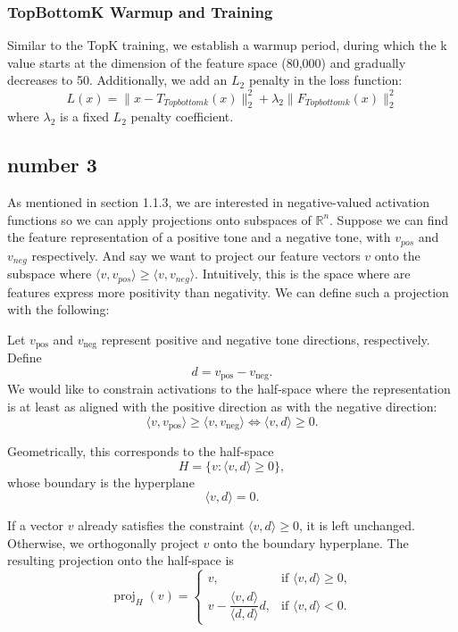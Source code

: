 \documentclass{article}
\begin{document}
\subsubsection{TopBottomK Warmup and Training}
    Similar to the TopK training, we establish a warmup period, during which the k value starts at the dimension of the feature space (80,000) and gradually decreases to 50. Additionally, we add an $L_2$ penalty in the loss function:
    $$
    L(x) = \|x - T_{Topbottomk}(x)\|_2^2 + \lambda_2 \|F_{Topbottomk}(x)\|_2^2
    $$
    where $\lambda_2$ is a fixed $L_2$ penalty coefficient.

\subsection{number 3}
As mentioned in section 1.1.3, we are interested in negative-valued activation functions so we can apply projections onto subspaces of $\mathbb{R}^n$. Suppose we can find the feature representation of a positive tone and a negative tone, with $v_{pos}$ and $v_{neg}$ respectively. And say we want to project our feature vectors $v$ onto the subspace where $\langle v, v_{pos}\rangle \geq \langle v, v_{neg}\rangle$. Intuitively, this is the space where are features express more positivity than negativity. We can define such a projection with the following:



Let \(v_{\text{pos}}\) and \(v_{\text{neg}}\) represent positive and negative tone directions, respectively. Define
\[
d = v_{\text{pos}} - v_{\text{neg}}.
\]
We would like to constrain activations to the half-space where the representation is at least as aligned with the positive direction as with the negative direction:
\[
\langle v, v_{\text{pos}} \rangle
\ge
\langle v, v_{\text{neg}} \rangle
\iff
\langle v, d \rangle \ge 0.
\]

Geometrically, this corresponds to the half-space
\[
H = \{v : \langle v, d \rangle \ge 0\},
\]
whose boundary is the hyperplane
\[
\langle v, d \rangle = 0.
\]

If a vector \(v\) already satisfies the constraint \(\langle v, d \rangle \ge 0\), it is left unchanged. Otherwise, we orthogonally project \(v\) onto the boundary hyperplane. The resulting projection onto the half-space is
\[
\operatorname{proj}_{H}(v)
=
\begin{cases}
v,
& \text{if } \langle v, d \rangle \ge 0, \\[8pt]
v - \dfrac{\langle v, d \rangle}{\langle d,d \rangle}d,
& \text{if } \langle v, d \rangle < 0.
\end{cases}
\]
\end{document}
